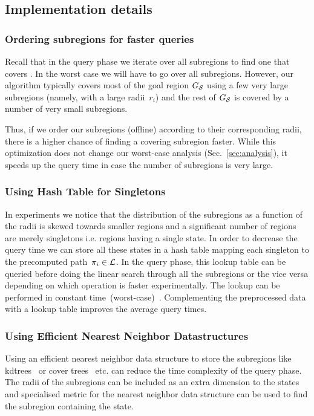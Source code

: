 \documentclass[a4paper,10pt]{article}
\begin{document}
\subsection{Implementation details}
\label{subsec:impl}

\subsubsection{Ordering subregions for faster queries}
Recall that in the query phase we iterate over all subregions to find one that covers \sGoal. 
In the worst case we will have to go over all subregions.
However,  our algorithm typically covers most of the goal region $G_\mathcal{S}$ using a few very large subregions (namely, with a large radii~$r_i$) and the rest of $G_\mathcal{S}$ is covered by a number of very small subregions.

Thus, if we order our subregions (offline) according to their corresponding radii, there is a higher chance of finding a covering subregion faster. While this optimization does not change our worst-case analysis (Sec.~\ref{sec:analysis}), it speeds up the query time in case the number of subregions is very large.

\subsubsection{Using Hash Table for Singletons}
In experiments we notice that the distribution of the subregions as a function of the radii is skewed towards smaller regions and a significant number of regions are merely singletons i.e. regions having a single state. In order to decrease the query time we can store all these states in a hash table mapping each singleton to the precomputed path~$\pi_i \in \mathcal{L}$.  In the query phase, this lookup table can be queried before doing the linear search through all the subregions or the vice versa depending on which operation is faster experimentally. The lookup can be performed in constant time~(worst-case)~\cite{czech1997perfect}. Complementing the preprocessed data with a lookup table improves the average query times.

\subsubsection{Using Efficient Nearest Neighbor Datastructures}
Using an efficient nearest neighbor data structure to store the subregions like kdtrees~\cite{bentley1975multidimensional} or cover trees~\cite{beygelzimer2006cover} etc. can reduce the time complexity of the query phase. The radii of the subregions can be included as an extra dimension to the states and specialised metric for the nearest neighbor data structure can be used to find the subregion containing the state.
\end{document}

